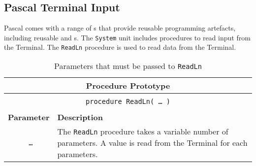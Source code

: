 \clearpage
\subsection{Pascal Terminal Input} %
\label{sub:pas_terminal_input}

Pascal comes with a range of s that provide reusable programming artefacts, including reusable  and s. The \texttt{System} unit includes procedures to read input from the Terminal. The \texttt{ReadLn} procedure is used to read data from the Terminal.

\begin{table}[h]
  \centering
  \begin{tabular}{|c|p{9cm}|}
    \hline
    \multicolumn{2}{|c|}{\textbf{Procedure Prototype}} \\
    \hline
    \multicolumn{2}{|c|}{} \\
    \multicolumn{2}{|c|}{\texttt{procedure ReadLn( {\ldots} )}} \\
    \multicolumn{2}{|c|}{} \\
    \hline
    \hline
    \textbf{Parameter} & \textbf{Description} \\
    \hline
    \texttt{ \ldots } & The \texttt{ReadLn} procedure takes a variable number of parameters. A value is read from the Terminal for each parameters. \\
    \hline
  \end{tabular}
  \caption{Parameters that must be passed to \texttt{ReadLn}}
  \label{tbl:readln parameters}
\end{table}


